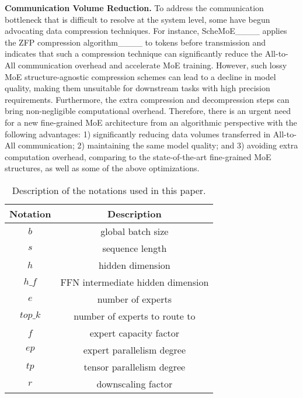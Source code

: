 \noindent\textbf{Communication Volume Reduction.} 
To address the communication bottleneck that is difficult to resolve at the system level, some have begun advocating data compression techniques. 
For instance, ScheMoE____ applies the ZFP compression algorithm____ to tokens before transmission and indicates that such a compression technique can significantly reduce the All-to-All communication overhead 
and accelerate MoE training. 
However, such lossy MoE structure-agnostic compression schemes can lead to a decline in model quality, making them unsuitable for downstream tasks with high precision requirements. Furthermore, the extra compression and decompression steps can bring non-negligible computational overhead. 
Therefore, there is an urgent need for a new fine-grained MoE architecture from an algorithmic perspective with the following advantages: 1) significantly reducing data volumes transferred in All-to-All communication; 2) maintaining the same model quality; and 3) avoiding extra computation overhead, comparing to the state-of-the-art fine-grained MoE structures, as well as some of the above optimizations.

\begin{table}[!t]
    \centering
    \begin{tabular}{c|c}
    \toprule[0.8pt]
    \textbf{Notation} & \textbf{Description} \\ \midrule[0.8pt]
    $b$        & global batch size \\ \hline 
    $s$        & sequence length \\ \hline 
    $h$        & hidden dimension \\ \hline 
    $h\_f$     & FFN intermediate hidden dimension \\ \hline 
    $e$        & number of experts \\ \hline 
    $top\_k$   & number of experts to route to \\ \hline 
    $f$        & expert capacity factor \\ \hline 
    $ep$       & expert parallelism degree \\ \hline 
    $tp$       & tensor parallelism degree \\ \hline 
    $r$        & downscaling factor \\ \bottomrule[0.8pt]
    \end{tabular}
    \caption{Description of the notations used in this paper.}
    \label{table.notation}
\end{table}